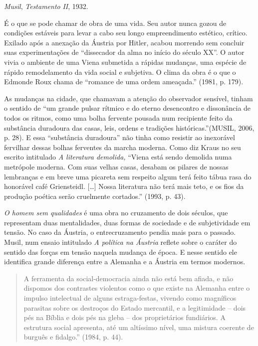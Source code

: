 \emph{Musil}, \emph{Testamento} \emph{II}, 1932.

É o que se pode chamar de obra de uma vida. Seu autor nunca gozou de
condições estáveis para levar a cabo seu longo empreendimento estético,
crítico. Exilado após a anexação da Áustria por Hitler, acabou morrendo
sem concluir suas experimentações de ``dissecador da alma no início do
século XX''. O autor vivia o ambiente de uma Viena submetida a rápidas
mudanças, uma espécie de rápido remodelamento da vida social e
subjetiva. O clima da obra é o que o Edmonde Roux chama de ``romance de
uma ordem ameaçada.'' (1981, p. 179).

As mudanças na cidade, que chamavam a atenção do observador sensível,
tinham o sentido de ``um grande pulsar rítmico e do eterno desencontro e
dissonância de todos os ritmos, como uma bolha fervente pousada num
recipiente feito da substância duradoura das casas, leis, ordens e
tradições históricas.''(MUSIL, 2006, p. 28). E essa ``substância
duradoura'' não tinha como resistir ao inexorável fervilhar dessas
bolhas ferventes da marcha moderna. Como diz Kraus no seu escrito
intitulado \emph{A literatura demolida,} ``Viena está sendo demolida
numa metrópole moderna. Com suas velhas casas, desabam os pilares de
nossas lembranças e em breve uma picareta sem respeito algum terá feito
tábua rasa do honorável café Griensteidl. {[}\ldots{}{]} Nossa
literatura não terá mais teto, e os fios da produção poética serão
cruelmente cortados.'' (1993, p. 43).

\emph{O homem sem qualidades} é uma obra no cruzamento de dois séculos,
que representam duas mentalidades, duas formas de sociedade e de
subjetividade em tensão. No caso da Áustria, o entrecruzamento pendia
mais para o passado. Musil, num ensaio intitulado \emph{A política na
Áustria} reflete sobre o caráter do sentido das forças em tensão naquela
mudança de época. E nesse sentido ele identifica grande diferença entre
a Alemanha e a Áustria em termos modernos.

\begin{quote}
A ferramenta da social-democracia ainda não está bem afiada, e não
dispomos dos contrastes violentos como o que existe na Alemanha entre o
impulso intelectual de alguns estraga-festas, vivendo como magníficos
parasitas sobre os destroços do Estado mercantil, e a legitimidade --
dois pés na Bíblia e dois pés na gleba -- dos proprietários fundiários.
A estrutura social apresenta, até um altíssimo nível, uma mistura
coerente de burguês e fidalgo.'' (1984, p. 44).
\end{quote}

